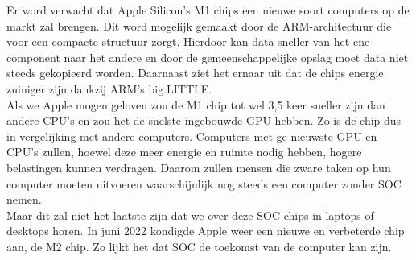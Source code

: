 \documentclass{hogent-article}
\begin{document}
Er word verwacht dat Apple Silicon's M1 chips een nieuwe soort computers op de markt zal brengen. Dit word mogelijk gemaakt door de ARM-architectuur die voor een compacte structuur zorgt. Hierdoor kan data sneller van het ene component naar het andere en door de gemeenschappelijke opslag moet data niet steeds gekopieerd worden. Daarnaast ziet het ernaar uit dat de chips energie zuiniger zijn dankzij ARM's big.LITTLE. \\
Als we Apple mogen geloven zou de M1 chip tot wel 3,5 keer sneller zijn dan andere CPU's en zou het de snelste ingebouwde GPU hebben. Zo is de chip dus in vergelijking met andere computers. Computers met ge nieuwste GPU en CPU's zullen, hoewel deze meer energie en ruimte nodig hebben, hogere belastingen kunnen verdragen. Daarom zullen mensen die zware taken op hun computer moeten uitvoeren waarschijnlijk nog steeds een computer zonder SOC nemen. \\
Maar dit zal niet het laatste zijn dat we over deze SOC chips in laptops of desktops horen. In juni 2022 kondigde Apple weer een nieuwe en verbeterde chip aan, de M2 chip. Zo lijkt het dat SOC de toekomst van de computer kan zijn.


\printbibliography[heading=bibintoc]
\end{document}
